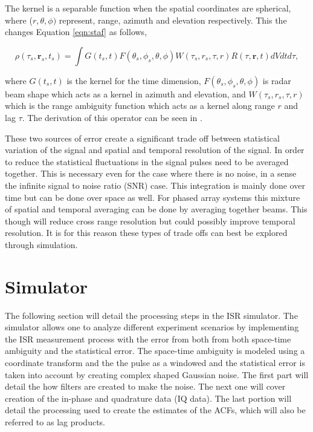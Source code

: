 \documentclass[draft,ras]{agutex}
\begin{document}
\begin{article}
The kernel is a separable function when the spatial coordinates are spherical, where ($r,\theta,\phi)$ represent, range, azimuth and elevation respectively. This the changes Equation \ref{eqn:staf} as follows,

\begin{equation}
\label{eqn:stafbrok}
\rho(\tau_s,\mathbf{r}_s,t_s)= \int G(t_s,t)F(\theta_s,\phi_s,\theta,\phi)W(\tau_s,r_s,\tau,r) R(\tau,\mathbf{r},t) dVdt d\tau,
\end{equation}

\noindent where $G(t_s,t)$ is the kernel for the time dimension, $F(\theta_s,\phi_s,\theta,\phi)$ is radar beam shape which acts as a kernel in azimuth and elevation, and $W(\tau_s,r_s,\tau,r) $ which is the range ambiguity function which acts as a kernel along range $r$ and lag $\tau$. The derivation of this operator can be seen in \citet{RDS:RDS20236}.

These two sources of error create a significant trade off between statistical variation of the signal and spatial and temporal resolution of the signal. In order to reduce the statistical fluctuations in the signal pulses need to be averaged together. This is necessary even for the case where there is no noise, in a sense the infinite signal to noise ratio (SNR) case. This integration is mainly done over time but can be done over space as well. For phased array systems this mixture of spatial and temporal averaging can be done by averaging together beams. This though will reduce cross range resolution but could possibly improve temporal resolution. It is for this reason these types of trade offs can best be explored through simulation.
\section{Simulator}

The following section will detail the processing steps in the ISR simulator. The simulator allows one to analyze different experiment scenarios by implementing the ISR measurement process with the error from both from both space-time ambiguity and the statistical error. The space-time ambiguity is modeled using a coordinate transform and the the pulse as a windowed and the statistical error is taken into account by creating complex shaped Gaussian noise. The first part will detail the how filters are created to make the noise. The next one will cover creation of the in-phase and quadrature data (IQ data). The last portion will detail the processing used to create the estimates of the ACFs, which will also be referred to as lag products.


\end{article}
\end{document}
